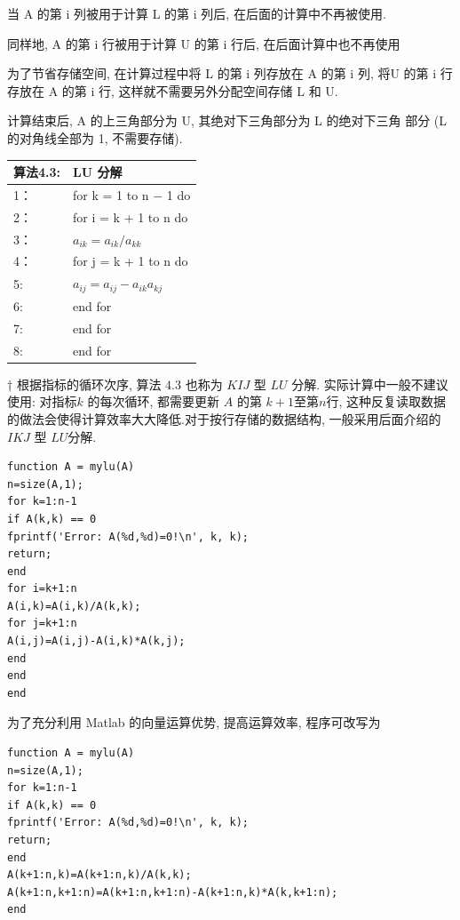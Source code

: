 \documentclass[12pt,a4paper]{article}
\begin{document}
当 A 的第 i 列被用于计算 L 的第 i 列后, 在后面的计算中不再被使用.

同样地, A 的第 i 行被用于计算 U 的第 i 行后, 在后面计算中也不再使用


为了节省存储空间, 在计算过程中将 L 的第 i 列存放在 A 的第 i 列, 将U 的第 i 行存放在 A 的第 i 行, 这样就不需要另外分配空间存储 L 和 U.

计算结束后, A 的上三角部分为 U, 其绝对下三角部分为 L 的绝对下三角
部分 (L 的对角线全部为 1, 不需要存储).
\newpage
\begin{table}  
	\begin{tabular*}{16cm}{ll}  
		\hline  
		算法4.3: & LU 分解 \\  
		\hline  
		1：   &for k = 1 to n − 1 do\\  
		2：   &\qquad for i = k + 1 to n do\\
		3：   &\qquad \qquad $a_{ik} = a_{ik}/a_{kk}$\\
		4：   &\qquad \qquad for j = k + 1 to n do\\
		5:    &\qquad \qquad \qquad $a_{ij} = a_{ij} − a_{ik}a_{kj}$\\
		6:    &\qquad \qquad end for\\
		7:    &\qquad end for\\
		8:    &end for \\
		\hline  
	\end{tabular*}  
\end{table} 



† 根据指标的循环次序, 算法 $4.3$ 也称为 $KIJ$ 型 $LU$ 分解. 实际计算中一般不建议使用: 对指标$k$ 的每次循环, 都需要更新 $A$ 的第 $k + 1 $至第$n $行, 这种反复读取数据的做法会使得计算效率大大降低.对于按行存储的数据结构, 一般采用后面介绍的 $IKJ$ 型 $LU$分解.




\begin{lstlisting}[language={[ANSI]C}] 
% Matlab code 1 : LU 分解
function A = mylu(A)
n=size(A,1);
for k=1:n-1
if A(k,k) == 0
fprintf('Error: A(%d,%d)=0!\n', k, k);
return;
end
for i=k+1:n
A(i,k)=A(i,k)/A(k,k);
for j=k+1:n
A(i,j)=A(i,j)-A(i,k)*A(k,j);
end
end
end
\end{lstlisting}

为了充分利用 Matlab 的向量运算优势, 提高运算效率, 程序可改写为
\begin{lstlisting}[language={[ANSI]C}] 
% Matlab code 2 : LU 分解
function A = mylu(A)
n=size(A,1);
for k=1:n-1
if A(k,k) == 0
fprintf('Error: A(%d,%d)=0!\n', k, k);
return;
end
A(k+1:n,k)=A(k+1:n,k)/A(k,k);
A(k+1:n,k+1:n)=A(k+1:n,k+1:n)-A(k+1:n,k)*A(k,k+1:n);
end
\end{lstlisting}
\end{document}
